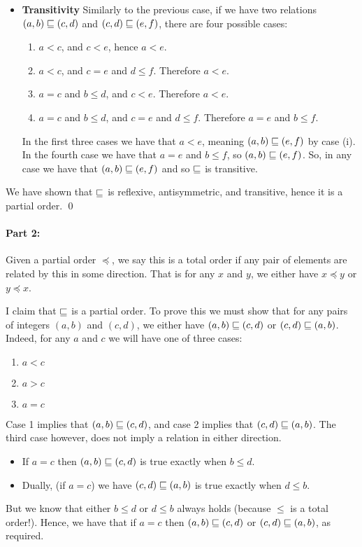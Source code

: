 \begin{itemize}
\item 
	\textbf{Transitivity}
	Similarly to the previous case, if we have two relations $(a, b) \sqsubseteq (c, d)$ and $(c, d) \sqsubseteq (e, f)$, there are four possible cases:
	\begin{enumerate}
		\item $a < c$, and $c < e$, hence $a < e$.
		\item $a < c$, and $c = e$ and $d \leq f$. Therefore $a < e$.
		\item $a = c$ and $b \leq d$, and $c < e$. Therefore $a < e$.
		\item $a = c$ and $b \leq d$, and $c = e$ and $d \leq f$. Therefore $a = e$ and $b\leq f$.
	\end{enumerate}
	In the first three cases we have that $a < e$, meaning $(a, b) \sqsubseteq (e, f)$ by case (i). In the fourth case we have that $a = e$ and $b \leq f$, so $(a, b) \sqsubseteq (e, f)$. So, in any case we have that $(a, b) \sqsubseteq (e, f)$ and so $\sqsubseteq$ is transitive.
\end{itemize}
We have shown that $\sqsubseteq$ is reflexive, antisymmetric, and transitive, hence it is a partial order. \qed


\paragraph{Part 2:}
Given a partial order $\preceq$, we say this is a total order if any pair of elements are related by this in some direction. That is for any $x$ and $y$, we either have $x \preceq y$ or $y \preceq x$.

I claim that $\sqsubseteq$ is a partial order. 
To prove this we must show that for any pairs of integers $(a, b)$ and $(c, d)$, we either have $(a, b) \sqsubseteq (c, d)$ or $(c, d) \sqsubseteq (a, b)$. 
Indeed, for any $a$ and $c$ we will have one of three cases:
\begin{enumerate}
	\item $a < c$
	\item $a > c$
	\item $a = c$
\end{enumerate}
Case 1 implies that $(a, b) \sqsubseteq (c, d)$, and case 2 implies that $(c, d) \sqsubseteq (a, b)$.
The third case however, does not imply a relation in either direction.
\begin{itemize}
\item If $a = c$ then $(a, b) \sqsubseteq (c, d)$ is true exactly when $b \leq d$.
\item Dually, (if $a = c$) we have $(c, d) \sqsubseteq (a, b)$ is true exactly when $d \leq b$.
\end{itemize}
But we know that either $b \leq d$ or $d \leq b$ always holds (because $\leq$ is a total order!). Hence, we have that if $a = c$ then $(a, b) \sqsubseteq (c, d)$ or $(c, d) \sqsubseteq (a, b)$, as required.

